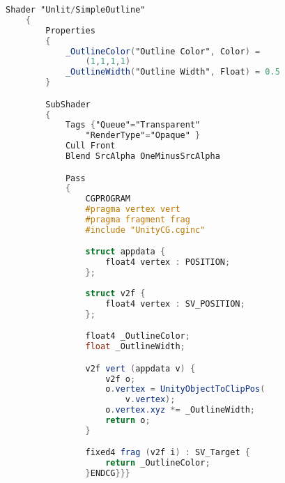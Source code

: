 \label{ap:codigo-fonte-contorno-hlsl}



	\begin{lstlisting}[language=GLSL, caption={\label{cf:outlineHLSL} Transcrição do shader de contorno de GLSL para HLSL}]
	Shader "Unlit/SimpleOutline" 
	{
		Properties 
		{
			_OutlineColor("Outline Color", Color) = 
				(1,1,1,1)
			_OutlineWidth("Outline Width", Float) = 0.5
		}

		SubShader 
		{
			Tags {"Queue"="Transparent" 
				"RenderType"="Opaque" }
			Cull Front
			Blend SrcAlpha OneMinusSrcAlpha

			Pass 
			{
				CGPROGRAM
				#pragma vertex vert
				#pragma fragment frag
				#include "UnityCG.cginc"

				struct appdata {
					float4 vertex : POSITION;
				};
				
				struct v2f {
					float4 vertex : SV_POSITION;
				};

				float4 _OutlineColor;
				float _OutlineWidth;

				v2f vert (appdata v) {
					v2f o;
					o.vertex = UnityObjectToClipPos(
						v.vertex);
					o.vertex.xyz *= _OutlineWidth;
					return o;
				}

				fixed4 frag (v2f i) : SV_Target {
					return _OutlineColor;
				}ENDCG}}}
\end{lstlisting}
